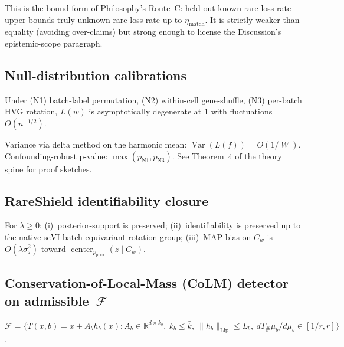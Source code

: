 \noindent This is the bound-form of Philosophy's Route~C: held-out-known-rare loss rate upper-bounds truly-unknown-rare loss rate up to $\eta_{\mathrm{match}}$. It is strictly weaker than equality (avoiding over-claims) but strong enough to license the Discussion's epistemic-scope paragraph.

\subsection{Null-distribution calibrations}
\label{sec:S1-nulls}

\begin{theorem}
\label{thm:S1-nulls}
Under (N1) batch-label permutation, (N2) within-cell gene-shuffle, (N3) per-batch HVG rotation, $L(w)$ is asymptotically degenerate at $1$ with fluctuations $O(n^{-1/2})$.
\end{theorem}

\noindent Variance via delta method on the harmonic mean: $\operatorname{Var}(L(f))=O(1/|W|)$. Confounding-robust p-value: $\max(p_{\mathrm{N1}},p_{\mathrm{N3}})$. See Theorem~4 of the theory spine for proof sketches.

\subsection{RareShield identifiability closure}
\label{sec:S1-real-closure}

\begin{theorem}
\label{thm:S1-real-closure}\label{prop:rs-identifiability}
For $\lambda\geq 0$: (i)~posterior-support is preserved; (ii)~identifiability is preserved up to the native scVI batch-equivariant rotation group; (iii)~MAP bias on $C_{w}$ is $O(\lambda\sigma_{z}^{2})$ toward $\operatorname{center}_{p_{\text{prior}}}(z\mid C_{w})$.
\end{theorem}

\subsection{Conservation-of-Local-Mass (CoLM) detector on admissible~$\mathcal{F}$}
\label{sec:S1-colm}

\begin{definition}
$\mathcal{F} = \bigl\{T(x,b)=x+A_{b}h_{b}(x) : A_{b}\in\mathbb{R}^{d\times k_{b}},\ k_{b}\leq \bar k,\ \|h_{b}\|_{\mathrm{Lip}}\leq L_{b},\ dT_{\#}\mu_{b}/d\mu_{b}\in[1/r, r]\bigr\}$.
\end{definition}

